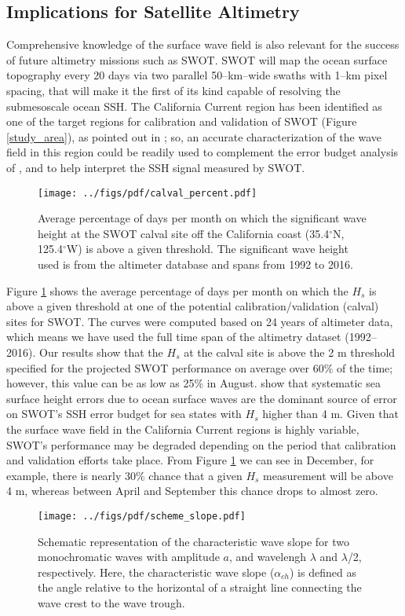 \subsection{Implications for Satellite Altimetry}
Comprehensive knowledge of the surface wave field is also relevant for the success of future altimetry missions such as SWOT\@. SWOT will map the ocean surface topography every 20 days via two parallel 50--km--wide swaths with 1--km pixel spacing, that will make it the first of its kind capable of resolving the submesoscale ocean SSH. The California Current region has been identified as one of the target regions for calibration and validation of SWOT (Figure \ref{study_area}), as pointed out in \cite{calval_white}; so, an accurate characterization of the wave field in this region could be readily used to complement the error budget analysis of \cite{peral2015impact}, and to help interpret the SSH signal measured by SWOT\@.
\begin{figure}[h]
\centering
\texttt{[image: ../figs/pdf/calval\_percent.pdf]}
\caption{Average percentage of days per month on which the significant wave height at the SWOT calval site off the California coast (35.4$^\circ$N, 125.4$^\circ$W) is above a given threshold. The significant wave height used is from the altimeter database and spans from 1992 to 2016.}
\label{calval}
\end{figure}
Figure \ref{calval} shows the average percentage of days per month on which the $H_s$ is above a given threshold at one of the potential calibration/validation (calval) sites for SWOT\@. The curves were computed based on 24 years of altimeter data, which means we have used the full time span of the altimetry dataset (1992--2016).
Our results show that the $H_s$ at the calval site is above the 2 m threshold specified for the projected SWOT performance on average over 60\% of the time; however, this value can be as low as 25\% in August.
\cite{peral2015impact} show that systematic sea surface height errors due to ocean surface waves are the dominant source of error on SWOT's SSH error budget for sea states with $H_s$ higher than 4 m. Given that the surface wave field in the California Current regions is highly variable, SWOT's performance may be degraded depending on the period that calibration and validation efforts take place. From Figure \ref{calval} we can see in December, for example, there is nearly 30\% chance that a given $H_s$ measurement will be above 4 m, whereas between April and September this chance drops to almost zero.
\begin{figure}
\centering
\texttt{[image: ../figs/pdf/scheme\_slope.pdf]}
\caption{Schematic representation of the characteristic wave slope for two monochromatic waves with amplitude $a$, and wavelengh $\lambda$ and $\lambda$/2, respectively. Here, the characteristic wave slope ($\alpha_{ch}$) is defined as the angle relative to the horizontal of a straight line connecting the wave crest to the wave trough.}
\label{scheme}
\end{figure}

